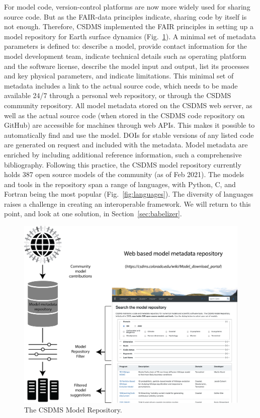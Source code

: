 \documentclass[journal abbreviation, manuscript]{copernicus}
\begin{document}
For model code, version-control platforms are now more widely used for sharing source code. But as the FAIR-data principles indicate, sharing code by itself is not enough. Therefore, CSDMS implemented the FAIR principles in setting up a model repository for Earth surface dynamics (Fig.~\ref{fig:repo}). A minimal set of metadata parameters is defined to: describe a model, provide contact information for the model development team, indicate technical details such as operating platform and the software license, describe the model input and output, list its processes and key physical parameters, and indicate limitations. This minimal set of metadata includes a link to the actual source code, which needs to be made available 24/7 through a personal web repository, or through the CSDMS community repository. All model metadata stored on the CSDMS web server, as well as the actual source code (when stored in the CSDMS code repository on GitHub) are accessible for machines through web APIs. This makes it possible to automatically find and use the model. DOIs for stable versions of any listed code are generated on request and included with the metadata. Model metadata are enriched by including additional reference information, such a comprehensive bibliography. Following this practice, the CSDMS model repository currently holds 387 open source models of the community (as of Feb 2021). The models and tools in the repository span a range of languages, with Python, C, and Fortran being the most popular (Fig.~\ref{fig:languages}). The diversity of languages raises a challenge in creating an interoperable framework. We will return to this point, and look at one solution, in Section~\ref{sec:babelizer}.

\begin{figure}[h!]
\centering
\includegraphics[width=5    in]{Figures/fig03.png}
\caption{The CSDMS Model Repository.}
\label{fig:repo}
\end{figure}
\end{document}
